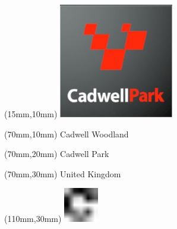 \null\newpage
\begin{textblock*}{50mm}(15mm,10mm)%
\includegraphics[width=50mm]{LG/2015-05-20_00076.png}
\end{textblock*}
\begin{textblock*}{130mm}(70mm,10mm)%
{\fontsize{20}{20}\selectfont Cadwell Woodland}\\
\end{textblock*}
\begin{textblock*}{120mm}(70mm,20mm)%
{\fontsize{16}{16}\selectfont Cadwell Park}\\
\end{textblock*}
\begin{textblock*}{120mm}(70mm,30mm)%
{\fontsize{12}{12}\selectfont United Kingdom}
\end{textblock*}
\begin{textblock*}{30mm}(110mm,30mm)%
\centering
\includegraphics[height=15mm]{icons/fa-rotate-right.pdf}
\end{textblock*}
